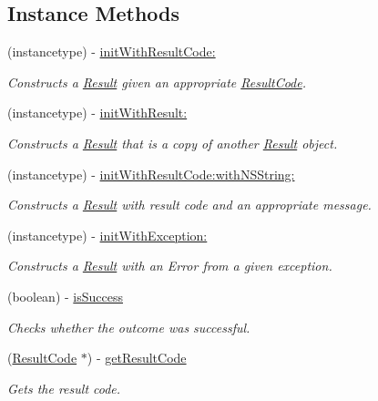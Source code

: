 \subsection*{Instance Methods}
\begin{DoxyCompactItemize}
\item 
(instancetype) -\/ \hyperlink{interface_result_ad316bfb1fc5cd0d3bc4221868746c164}{init\+With\+Result\+Code\+:}
\begin{DoxyCompactList}\small\item\em Constructs a \hyperlink{interface_result}{Result} given an appropriate \hyperlink{interface_result_code}{Result\+Code}. \end{DoxyCompactList}\item 
(instancetype) -\/ \hyperlink{interface_result_a35c4c32bd595b710980c88eccf85ed6a}{init\+With\+Result\+:}
\begin{DoxyCompactList}\small\item\em Constructs a \hyperlink{interface_result}{Result} that is a copy of another \hyperlink{interface_result}{Result} object. \end{DoxyCompactList}\item 
(instancetype) -\/ \hyperlink{interface_result_a9a463afa02ca8f0fea4d05dd98468b1a}{init\+With\+Result\+Code\+:with\+N\+S\+String\+:}
\begin{DoxyCompactList}\small\item\em Constructs a \hyperlink{interface_result}{Result} with result code and an appropriate message. \end{DoxyCompactList}\item 
(instancetype) -\/ \hyperlink{interface_result_a69a87669b3432211addbb927e22f9de6}{init\+With\+Exception\+:}
\begin{DoxyCompactList}\small\item\em Constructs a \hyperlink{interface_result}{Result} with an Error from a given exception. \end{DoxyCompactList}\item 
(boolean) -\/ \hyperlink{interface_result_a3c3f1b7989edde161fb082fe178290be}{is\+Success}
\begin{DoxyCompactList}\small\item\em Checks whether the outcome was successful. \end{DoxyCompactList}\item 
(\hyperlink{interface_result_code}{Result\+Code} $\ast$) -\/ \hyperlink{interface_result_a1aba712f58f0fa0c066db7c8c34d5269}{get\+Result\+Code}
\begin{DoxyCompactList}\small\item\em Gets the result code. \end{DoxyCompactList}\item 

\end{DoxyCompactItemize}
